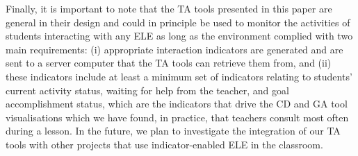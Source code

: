 Finally, it is important to note that the TA tools presented in this
paper are general in their design and could in principle be used to
monitor the activities of students interacting with any ELE as long as
the environment complied with two main requirements: (i) appropriate
interaction indicators are generated and are sent to a server computer
that the TA tools can retrieve them from, and (ii) these indicators
include at least a minimum set of indicators relating to students’
current activity status, waiting for help from the teacher, and goal
accomplishment status, which are the indicators that drive the CD and
GA tool visualisations which we have found, in practice, that teachers
consult most often during a lesson. In the future, we plan to
investigate the integration of our TA tools with other projects that
use indicator-enabled ELE in the classroom.